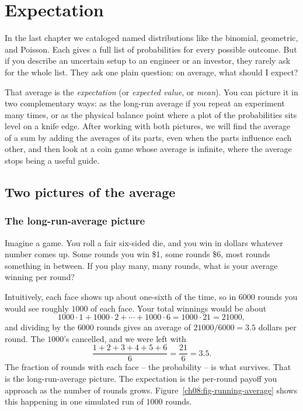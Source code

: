 \chapter{Expectation}

In the last chapter we cataloged named distributions like the binomial,
geometric, and Poisson. Each gives a full list of probabilities for every
possible outcome. But if you describe an uncertain setup to an engineer or an
investor, they rarely ask for the whole list. They ask one plain question: on
average, what should I expect?

That average is the \emph{expectation} (or \emph{expected value}, or
\emph{mean}). You can picture it in two complementary ways: as the long-run
average if you repeat an experiment many times, or as the physical balance
point where a plot of the probabilities sits level on a knife edge. After
working with both pictures, we will find the average of a sum by adding the
averages of its parts, even when the parts influence each other, and then look
at a coin game whose average is infinite, where the average stops being a useful
guide.

\chapterline

\section{Two pictures of the average}
\label{ch08:two-pictures}

\subsection{The long-run-average picture}

Imagine a game. You roll a fair six-sided die, and you win in dollars whatever
number comes up. Some rounds you win \$1, some rounds \$6, most rounds something
in between. If you play many, many rounds, what is your average winning per
round?

Intuitively, each face shows up about one-sixth of the time, so in $6000$ rounds
you would see roughly $1000$ of each face. Your total winnings would be about
\[
  1000\cdot 1 + 1000\cdot 2 + \cdots + 1000 \cdot 6 = 1000\cdot 21 = 21000,
\]
and dividing by the $6000$ rounds gives an average of $21000/6000 = 3.5$ dollars
per round. The $1000$'s cancelled, and we were left with
\[
  \frac{1+2+3+4+5+6}{6} = \frac{21}{6} = 3.5.
\]
The fraction of rounds with each face -- the probability -- is what survives.
That is the long-run-average picture. The expectation is the per-round payoff you
approach as the number of rounds grows. Figure~\ref{ch08:fig-running-average}
shows this happening in one simulated run of $1000$ rounds.

